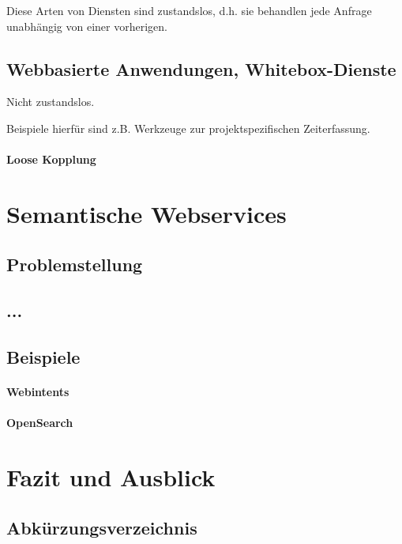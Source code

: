 \documentclass[10pt,a4paper]{article}
\begin{document}
Diese Arten von Diensten sind zustandslos, d.h. sie behandlen jede Anfrage unabhängig von einer vorherigen.
\subsection{Webbasierte Anwendungen, Whitebox-Dienste}
\label{l:webanw}
Nicht zustandslos.

Beispiele hierfür sind z.B. Werkzeuge zur projektspezifischen Zeiterfassung. 
\paragraph{Loose Kopplung}
\label{l:loosec}

\section{Semantische Webservices}

\subsection{Problemstellung}

\subsection{...}

\subsection{Beispiele}

\paragraph{Webintents}

\paragraph{OpenSearch}

\section{Fazit und Ausblick}

\pagebreak

\subsection*{Abkürzungsverzeichnis}
\begin{acronym}
\end{acronym}


\end{document}

